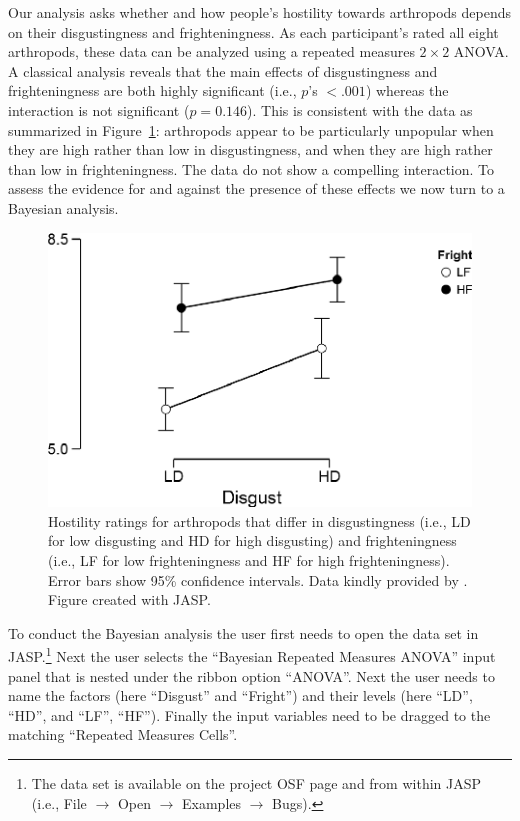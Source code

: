 Our analysis asks whether and how people's hostility towards arthropods depends on their disgustingness and frighteningness. As each participant's rated all eight arthropods, these data can be analyzed using a repeated measures $2\times2$ ANOVA. A classical analysis reveals that the main effects of disgustingness and frighteningness are both highly significant (i.e., $p$'s $< .001$) whereas the interaction is not significant ($p=0.146$). This is consistent with the data as summarized in Figure~\ref{fig:bi2:ArthropodDescriptivePlot}: arthropods appear to be particularly unpopular when they are high rather than low in disgustingness, and when they are high rather than low in frighteningness. The data do not show a compelling interaction. To assess the evidence for and against the presence of these effects we now turn to a Bayesian analysis.

\begin{figure}[tp]
    \begin{center}
        \includegraphics[width=.65\textwidth]{figs/bi2_ArthropodDescriptivePlot.eps}
        \caption{Hostility ratings for arthropods that differ in disgustingness (i.e., LD for low disgusting and HD for high disgusting) and frighteningness (i.e., LF for low frighteningness and HF for high frighteningness). Error bars show 95\% confidence intervals. Data kindly provided by \protect {}. Figure created with JASP.} \label{fig:bi2:ArthropodDescriptivePlot}
    \end{center}
\end{figure}

To conduct the Bayesian analysis the user first needs to open the data set in JASP.\footnote{The data set is available on the project OSF page and from within JASP (i.e., File $\rightarrow$ Open $\rightarrow$ Examples $\rightarrow$ Bugs).} Next the user selects the ``Bayesian Repeated Measures ANOVA'' input panel that is nested under the ribbon option ``ANOVA''. Next the user needs to name the factors (here ``Disgust'' and ``Fright'') and their levels (here ``LD'', ``HD'', and ``LF'', ``HF''). Finally the input variables need to be dragged to the matching ``Repeated Measures Cells''.

